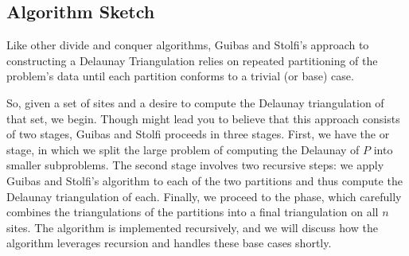 \documentclass[12pt,twoside]{reedthesis}
\begin{document}



  \subsection{Algorithm Sketch}
  \label{sub:gs_sketch}
    Like other divide and conquer algorithms, Guibas and Stolfi's approach to constructing a Delaunay Triangulation relies on repeated partitioning of the problem's data until each partition conforms to a trivial (or base) case.

    So, given a set of sites and a desire to compute the Delaunay triangulation of that set, we begin. Though  might lead you to believe that this approach consists of two stages, Guibas and Stolfi proceeds in three stages. First, we have the  or  stage, in which we split the large problem of computing the Delaunay of $P$ into smaller subproblems. The second stage involves two recursive steps: we apply Guibas and Stolfi's algorithm to each of the two partitions and thus compute the Delaunay triangulation of each. Finally, we proceed to the  phase, which carefully combines the triangulations of the partitions into a final triangulation on all $n$ sites. The algorithm is implemented recursively, and we will discuss how the algorithm leverages recursion and handles these base cases shortly. \par

\end{document}
